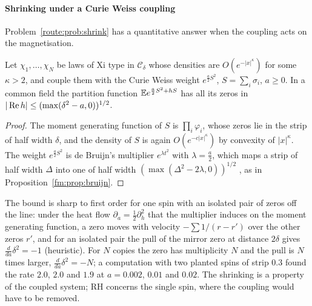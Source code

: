 \paragraph{Shrinking under a Curie Weiss coupling} Problem~\ref{route:prob:shrink} has a quantitative answer when the coupling acts on the magnetisation.

\begin{proposition}\label{route:prop:cw}
Let $\chi_1,\dots,\chi_N$ be laws of Xi type in $\mathcal C_\delta$ whose densities are $O(e^{-|x|^\kappa})$ for some $\kappa>2$, and couple them with the Curie Weiss weight $e^{\frac a2S^2}$, $S=\sum_i\sigma_i$, $a\ge0$. In a common field the partition function $\mathbb{E} e^{\frac a2S^2+hS}$ has all its zeros in $|\operatorname{Re} h|\le(\max(\delta^2-a,0))^{1/2}$.
\end{proposition}

\begin{proof}
The moment generating function of $S$ is $\prod_i\varphi_i$, whose zeros lie in the strip of half width $\delta$, and the density of $S$ is again $O(e^{-c|x|^\kappa})$ by convexity of $|x|^\kappa$. The weight $e^{\frac a2S^2}$ is de Bruijn's multiplier $e^{\lambda t^2}$ with $\lambda=\frac a2$, which maps a strip of half width $\Delta$ into one of half width $(\max(\Delta^2-2\lambda,0))^{1/2}$ \cite[Theorem 13]{deBruijn}, as in Proposition~\ref{fm:prop:bruijn}.
\end{proof}

The bound is sharp to first order for one spin with an isolated pair of zeros off the line: under the heat flow $\partial_a=\frac12\partial_h^2$ that the multiplier induces on the moment generating function, a zero moves with velocity $-\sum1/(r-r')$ over the other zeros $r'$, and for an isolated pair the pull of the mirror zero at distance $2\delta$ gives $\frac d{da}\delta^2=-1$ (heuristic). For $N$ copies the zero has multiplicity $N$ and the pull is $N$ times larger, $\frac d{da}\delta^2=-N$; a computation with two planted spins of strip $0.3$ found the rate $2.0$, $2.0$ and $1.9$ at $a=0.002$, $0.01$ and $0.02$. The shrinking is a property of the coupled system; RH concerns the single spin, where the coupling would have to be removed.

